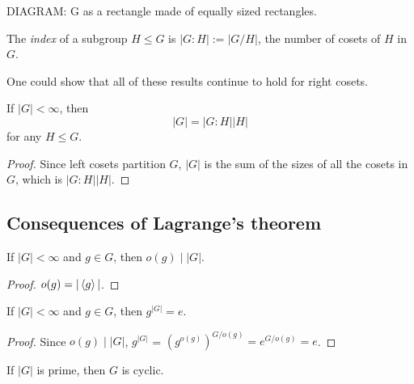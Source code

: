 \documentclass{../template/note}
\begin{document}
    DIAGRAM: G as a rectangle made of equally sized rectangles.

    \begin{definition}
        The \emph{index} of a subgroup \(H \leq G\) is \(|G : H| := |G / H|\), the number of cosets of \(H\) in \(G\).
    \end{definition}
    
    \begin{remark*}
        One could show that all of these results continue to hold for right cosets.
    \end{remark*}
    
    \begin{theorem}[Lagrange]
        If \(|G| < \infty\), then
        \[
            |G| = |G:H||H|
        \]
        for any \(H \leq G\).
    \end{theorem}
    
    \begin{proof}
        Since left cosets partition \(G\), \(|G|\) is the sum of the sizes of all the cosets in \(G\), which is \(|G : H||H|\).
    \end{proof}
    
    \subsection{Consequences of Lagrange's theorem}

    \begin{corollary}
        If \(|G| < \infty\) and \(g \in G\), then \(o(g) \mid |G|\).
    \end{corollary}
    
    \begin{proof}
        \(o(g) = |\left \langle g \right \rangle|\).
    \end{proof}
    
    \begin{corollary}
        If \(|G| < \infty\) and \(g \in G\), then \(g^{|G|} = e\).
        \label{element-to-order-is-identity}
    \end{corollary}
    
    \begin{proof}
        Since \(o(g) \mid |G|\), \(g^{|G|}\) = \((g^{o(g)})^{G/o(g)} = e^{G/o(g)} = e\).
    \end{proof}
    
    \begin{corollary}
        If \(|G|\) is prime, then \(G\) is cyclic.
        \label{prime-groups-cyclic}
    \end{corollary}
    
\end{document}
